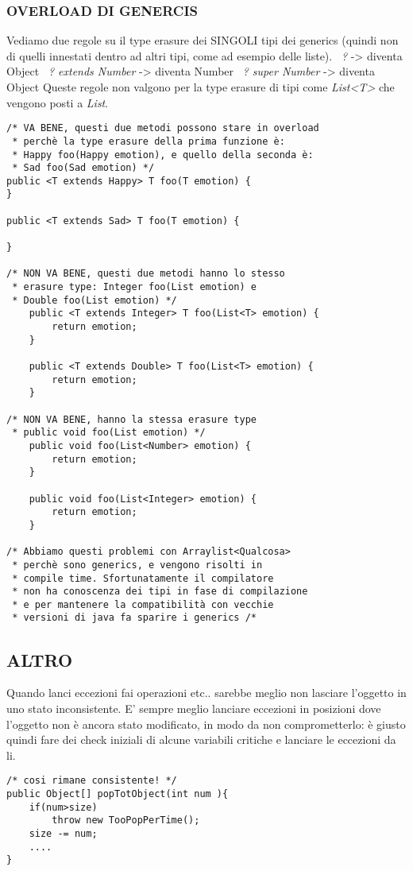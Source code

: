 \noindent \subsubsection{OVERLOAD DI GENERCIS}
\noindent Vediamo due regole su il type erasure dei SINGOLI tipi dei generics (quindi non di quelli innestati dentro ad altri tipi, come ad esempio delle liste). \newline
\textbullet\ \textit{?} -> diventa Object \newline
\textbullet\ \textit{? extends Number} -> diventa Number \newline
\textbullet\ \textit{? super Number} -> diventa Object \newline
Queste regole non valgono per la type erasure di tipi come \textit{List<T>} che vengono posti a \textit{List}.
\begin{lstlisting}
/* VA BENE, questi due metodi possono stare in overload
 * perchè la type erasure della prima funzione è:
 * Happy foo(Happy emotion), e quello della seconda è:
 * Sad foo(Sad emotion) */
public <T extends Happy> T foo(T emotion) {
}   

public <T extends Sad> T foo(T emotion) {

} 

/* NON VA BENE, questi due metodi hanno lo stesso
 * erasure type: Integer foo(List emotion) e
 * Double foo(List emotion) */
	public <T extends Integer> T foo(List<T> emotion) {
		return emotion;
	}   
	
	public <T extends Double> T foo(List<T> emotion) {
		return emotion;
	} 
	
/* NON VA BENE, hanno la stessa erasure type
 * public void foo(List emotion) */
	public void foo(List<Number> emotion) {
		return emotion;
	}   
	
	public void foo(List<Integer> emotion) {
		return emotion;
	} 
	
/* Abbiamo questi problemi con Arraylist<Qualcosa>
 * perchè sono generics, e vengono risolti in
 * compile time. Sfortunatamente il compilatore
 * non ha conoscenza dei tipi in fase di compilazione
 * e per mantenere la compatibilità con vecchie 
 * versioni di java fa sparire i generics /*	
\end{lstlisting}


\subsection{ALTRO}
\noindent Quando lanci eccezioni fai operazioni etc.. sarebbe meglio non lasciare l'oggetto in uno stato inconsistente. E' sempre meglio lanciare eccezioni in posizioni dove l'oggetto non è ancora stato modificato, in modo da non comprometterlo: è giusto quindi fare dei check iniziali di alcune variabili critiche e lanciare le eccezioni da li. 
\begin{lstlisting}
/* cosi rimane consistente! */
public Object[] popTotObject(int num ){
	if(num>size)
		throw new TooPopPerTime();
	size -= num;
	....
}
\end{lstlisting}

